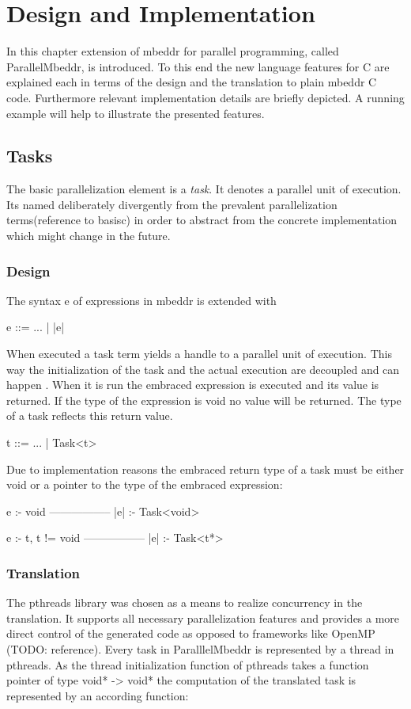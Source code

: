 \chapter{Design and Implementation}
In this chapter extension of mbeddr for parallel programming, called ParallelMbeddr, is introduced. To this end the new language features for C are explained each in terms of the design and the translation to plain mbeddr C code. Furthermore relevant implementation details are briefly depicted. A running example will help to illustrate the presented features.


\section{Tasks}
The basic parallelization element is a \textit{task}. It denotes a parallel unit of execution. Its named deliberately divergently from the prevalent parallelization terms(reference to basisc) in order to abstract from the concrete implementation which might change in the future.
\subsection{Design}
The syntax e of expressions in mbeddr is extended with

e ::= ... | |e|

When executed a task term yields a handle to a parallel unit of execution. This way the initialization of the task and the actual execution are decoupled and can happen . When it is run the embraced expression is executed and its value is returned. If the type of the expression is void no value will be returned. The type of a task reflects this return value.

t ::= ... | Task<t>

Due to implementation reasons the embraced return type of a task must be either void or a pointer to the type of the embraced expression:

e :- void
-----------------
|e| :- Task<void>

e :- t, t != void
-----------------
|e| :- Task<t*>


\subsection{Translation}
The pthreads library was chosen as a means to realize concurrency in the translation. It supports all necessary parallelization features and provides a more direct control of the generated code as opposed to frameworks like OpenMP (TODO: reference). Every task in ParalllelMbeddr is represented by a thread in pthreads. As the thread initialization function of pthreads takes a function pointer of type void* -> void* the computation of the translated task is represented by an according function:


